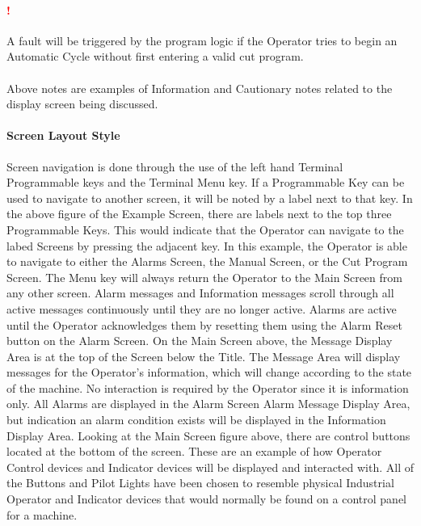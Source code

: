 \paragraph*{\textbf{{\LARGE \textcolor{red}{!}}}}A fault will be triggered by the program logic if the Operator tries to begin an Automatic Cycle without first entering a valid cut program.

\paragraph*{}
Above notes are examples of Information and Cautionary notes related to the display screen being discussed. 

\paragraph{Screen Layout Style}
 Screen navigation is done through the use of the left hand Terminal Programmable keys and the Terminal Menu key. If a Programmable Key can be used to navigate to another screen, it will be noted by a label next to that key. In the above figure of the Example Screen, there are labels next to the top three Programmable Keys. This would indicate that the Operator can navigate to the labed Screens by pressing the adjacent key. In this example, the Operator is able to navigate to either the Alarms Screen, the Manual Screen, or the Cut Program Screen. The Menu key will always return the Operator to the Main Screen from any other screen. Alarm messages and Information messages scroll through all active messages continuously until they are no longer active. Alarms are active until the Operator acknowledges them by resetting them using the Alarm Reset button on the Alarm Screen. On the Main Screen above, the Message Display Area is at the top of the Screen below the Title. The Message Area will display messages for the Operator's information, which will change according to the state of the machine. No interaction is required by the Operator since it is information only. All Alarms are displayed in the Alarm Screen Alarm Message Display Area, but indication an alarm condition exists will be displayed in the Information Display Area. Looking at the Main Screen figure above, there are control buttons located at the bottom of the screen. These are an example of how Operator Control devices and Indicator devices will be displayed and interacted with. All of the Buttons and Pilot Lights have been chosen to resemble physical Industrial Operator and Indicator devices that would normally be found on a control panel for a machine.
